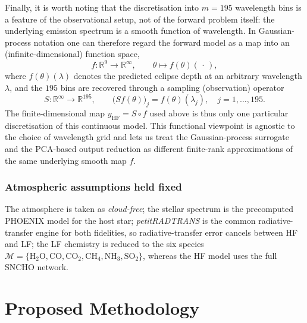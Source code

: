 \documentclass[11pt,a4paper]{article}
\newcommand{\researchq}[1]{%
  \par\smallskip\noindent
  \textbf{\textcolor{blue}{Research question.}}\,\textit{#1}\par\smallskip}
\newcommand{\thref}[1]{{\color{teal}\textit{Thesis: #1}}}
\begin{document}
Finally, it is worth noting that the discretisation into $m=195$ wavelength
bins is a feature of the observational setup, not of the forward problem
itself: the underlying emission spectrum is a smooth function of wavelength.
In Gaussian-process notation one can therefore regard the forward model as a
map into an (infinite-dimensional) function space,
\[
    f:\mathbb{R}^{9}\longrightarrow\mathbb{R}^{\infty},
    \qquad
    \theta\longmapsto f(\theta)(\,\cdot\,),
\]
where $f(\theta)(\lambda)$ denotes the predicted eclipse depth at an arbitrary
wavelength $\lambda$, and the $195$ bins are recovered through a sampling
(observation) operator
\[
    S:\mathbb{R}^{\infty}\longrightarrow\mathbb{R}^{195},
    \qquad
    \bigl(Sf(\theta)\bigr)_j = f(\theta)(\lambda_j),
    \quad j=1,\ldots,195 .
\]
The finite-dimensional map $y_{\mathrm{HF}}=S\circ f$ used above is thus only
one particular discretisation of this continuous model. This functional
viewpoint is agnostic to the choice of wavelength grid and lets us treat the
Gaussian-process surrogate and the PCA-based output reduction as different
finite-rank approximations of the same underlying smooth map $f$.


\subsubsection*{Atmospheric assumptions held fixed}
The atmosphere is taken as \emph{cloud-free}; the stellar spectrum is the precomputed PHOENIX model for the host star; \emph{petitRADTRANS} is the common radiative-transfer engine for both fidelities, so radiative-transfer error cancels between HF and LF; the LF chemistry is reduced to the six species 
$\mathcal{M} = \{\mathrm{H_{2}O},\mathrm{CO},\mathrm{CO_{2}},
\mathrm{CH_{4}},\mathrm{NH_{3}},\mathrm{SO_{2}}\}$,
whereas the HF model uses the full SNCHO network.\\

\section{Proposed Methodology}
\label{sec:gpmf}

\end{document}
